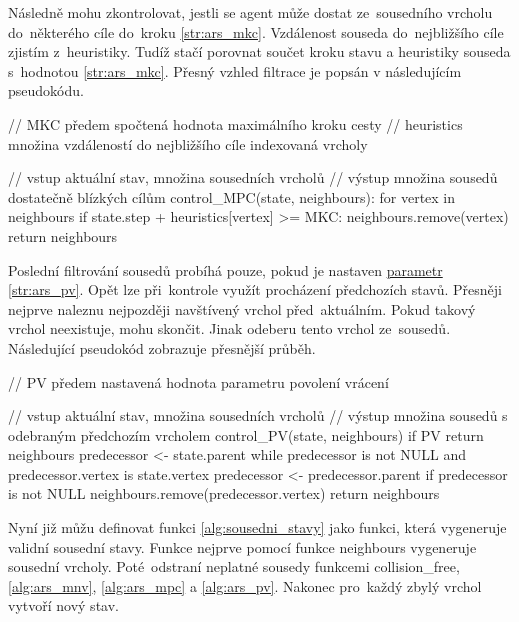 Následně mohu zkontrolovat, jestli se agent může dostat ze~sousedního vrcholu
do~některého cíle do~kroku \ref{str:ars_mkc}.
Vzdálenost souseda do~nejbližšího cíle zjistím z~heuristiky.
Tudíž stačí porovnat součet kroku stavu a heuristiky souseda s~hodnotou \ref{str:ars_mkc}.
Přesný vzhled filtrace je popsán v následujícím pseudokódu.

\begin{code}[fontsize=\footnotesize]
// MKC předem spočtená hodnota maximálního kroku cesty
// heuristics množina vzdáleností do nejbližšího cíle indexovaná vrcholy

// vstup aktuální stav, množina sousedních vrcholů
// výstup množina sousedů dostatečně blízkých cílům
control_MPC(state, neighbours):
  for vertex in neighbours
    if state.step + heuristics[vertex] >= MKC:
      neighbours.remove(vertex)
  return neighbours
\end{code}

Poslední filtrování sousedů probíhá pouze, pokud je nastaven
\hyperref[subsubsec:ars_parametry]{parametr} \ref{str:ars_pv}.
Opět lze při~kontrole využít procházení předchozích stavů.
Přesněji nejprve naleznu nejpozději navštívený vrchol před~aktuálním.
Pokud takový vrchol neexistuje, mohu skončit.
Jinak odeberu tento vrchol ze~sousedů.
Následující pseudokód zobrazuje přesnější průběh.

\begin{code}[fontsize=\footnotesize]
// PV předem nastavená hodnota parametru povolení vrácení

// vstup aktuální stav, množina sousedních vrcholů
// výstup množina sousedů s odebraným předchozím vrcholem
control_PV(state, neighbours)
  if PV
    return neighbours
  predecessor <- state.parent
  while predecessor is not NULL and predecessor.vertex is state.vertex
    predecessor <- predecessor.parent
  if predecessor is not NULL
    neighbours.remove(predecessor.vertex)
  return neighbours
\end{code}

Nyní již můžu definovat funkci \ref{alg:sousedni_stavy} jako funkci, která vygeneruje validní sousední stavy.
Funkce nejprve pomocí funkce \textrm{neighbours} vygeneruje sousední vrcholy.
Poté~odstraní neplatné sousedy funkcemi \textrm{collision\_free},
\ref{alg:ars_mnv}, \ref{alg:ars_mpc} a \ref{alg:ars_pv}.
Nakonec pro~každý zbylý vrchol vytvoří nový stav.

